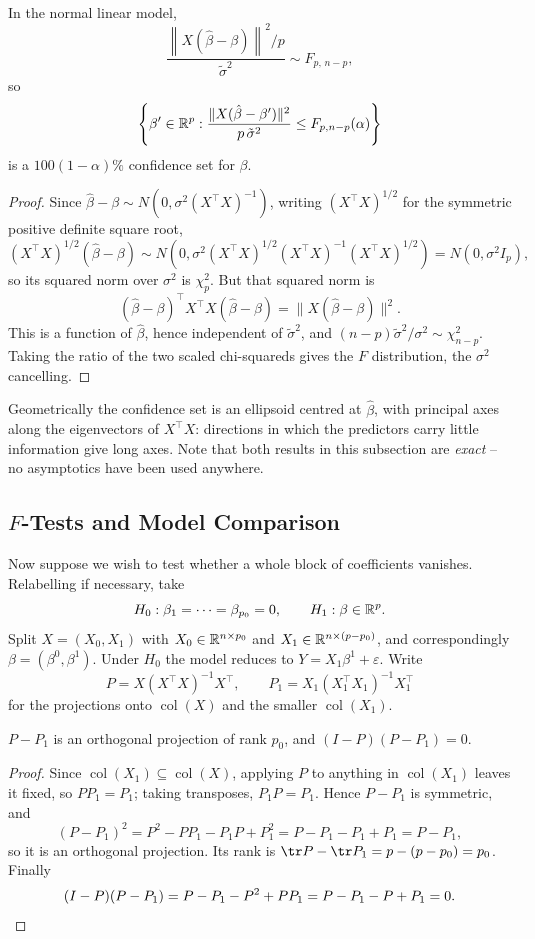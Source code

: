 \documentclass[a4paper]{scrartcl}
\newcommand{\col}{\operatorname{col}}
\begin{document}
\begin{proposition}
  In the normal linear model,
  $$
  \frac{\left\|X(\hat\beta - \beta)\right\|^2/p}{\tilde\sigma^2}\sim F_{p,\,n-p},
  $$
  so
  $$
  \left\{\beta'\in\mathbb{R}^p : \frac{\|X(\hat\beta - \beta')\|^2}{p\,\tilde\sigma^2}\leq F_{p,n-p}(\alpha)\right\}
  $$
  is a $100(1-\alpha)\%$ confidence set for $\beta$.
\end{proposition}
\begin{proof}
  Since $\hat\beta - \beta\sim N(0,\sigma^2(X^\top X)^{-1})$, writing $(X^\top X)^{1/2}$ for the symmetric positive definite square root,
  $$
  (X^\top X)^{1/2}(\hat\beta - \beta)\sim N\left(0,\sigma^2(X^\top X)^{1/2}(X^\top X)^{-1}(X^\top X)^{1/2}\right) = N(0,\sigma^2 I_p),
  $$
  so its squared norm over $\sigma^2$ is $\chi^2_p$. But that squared norm is
  $$
  (\hat\beta-\beta)^\top X^\top X(\hat\beta-\beta) = \|X(\hat\beta-\beta)\|^2.
  $$
  This is a function of $\hat\beta$, hence independent of $\tilde\sigma^2$, and $(n-p)\tilde\sigma^2/\sigma^2\sim\chi^2_{n-p}$. Taking the ratio of the two scaled chi-squareds gives the $F$ distribution, the $\sigma^2$ cancelling.
\end{proof}

Geometrically the confidence set is an ellipsoid centred at $\hat\beta$, with principal axes along the eigenvectors of $X^\top X$: directions in which the predictors carry little information give long axes. Note that both results in this subsection are \emph{exact} -- no asymptotics have been used anywhere.

\subsection{\texorpdfstring{$F$}{F}-Tests and Model Comparison}

Now suppose we wish to test whether a whole block of coefficients vanishes. Relabelling if necessary, take
$$
H_0 : \beta_1 = \cdots = \beta_{p_0} = 0, \qquad H_1 : \beta\in\mathbb{R}^p.
$$
Split $X = (X_0, X_1)$ with $X_0\in\mathbb{R}^{n\times p_0}$ and $X_1 \in\mathbb{R}^{n\times(p-p_0)}$, and correspondingly $\beta = (\beta^0,\beta^1)$. Under $H_0$ the model reduces to $Y = X_1\beta^1+\varepsilon$. Write
$$
P = X(X^\top X)^{-1}X^\top, \qquad P_1 = X_1(X_1^\top X_1)^{-1}X_1^\top
$$
for the projections onto $\col(X)$ and the smaller $\col(X_1)$.

\begin{lemma}\label{lem:ppp}
  $P - P_1$ is an orthogonal projection of rank $p_0$, and $(I-P)(P-P_1) = 0$.
\end{lemma}
\begin{proof}
  Since $\col(X_1)\subseteq\col(X)$, applying $P$ to anything in $\col(X_1)$ leaves it fixed, so $PP_1 = P_1$; taking transposes, $P_1P = P_1$. Hence $P - P_1$ is symmetric, and
  $$
  (P-P_1)^2 = P^2 - PP_1 - P_1P + P_1^2 = P - P_1 - P_1 + P_1 = P - P_1,
  $$
  so it is an orthogonal projection. Its rank is $\tr P - \tr P_1 = p - (p-p_0) = p_0$. Finally
  $$
  (I-P)(P-P_1) = P - P_1 - P^2 + PP_1 = P - P_1 - P + P_1 = 0. \qedhere
  $$
\end{proof}
\end{document}
